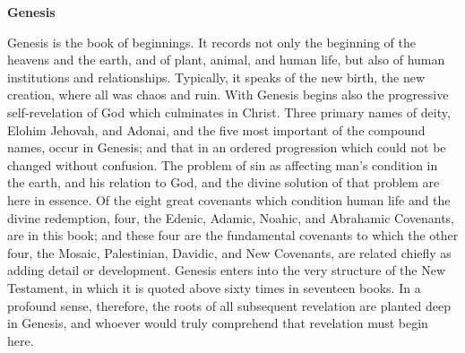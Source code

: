 \documentclass[10pt,landscape,twocolumn,letterpaper]{article}
\begin{document}


\begin{center}
\textbf{Genesis}
\end{center}
Genesis is the book of beginnings.  It records not only the beginning of the heavens and the earth, and of plant, animal, and human life, but also of human institutions and relationships.  Typically, it speaks of the new birth, the new creation, where all was chaos and ruin.  With Genesis begins also the progressive self-revelation of God which culminates in Christ.  Three primary names of deity, Elohim Jehovah, and Adonai, and the five most important of the compound names, occur in Genesis; and that in an ordered progression which could not be changed without confusion.  The problem of sin as affecting man's condition in the earth, and his relation to God, and the divine solution of that problem are here in essence.  Of the eight great covenants which condition human life and the divine redemption, four, the Edenic, Adamic, Noahic, and Abrahamic Covenants, are in this book; and these four are the fundamental covenants to which the other four, the Mosaic, Palestinian, Davidic, and New Covenants, are related chiefly as adding detail or development.  Genesis enters into the very structure of the New Testament, in which it is quoted above sixty times in seventeen books.  In a profound sense, therefore, the roots of all subsequent revelation are planted deep in Genesis, and whoever would truly comprehend that revelation must begin here.
\end{document}
